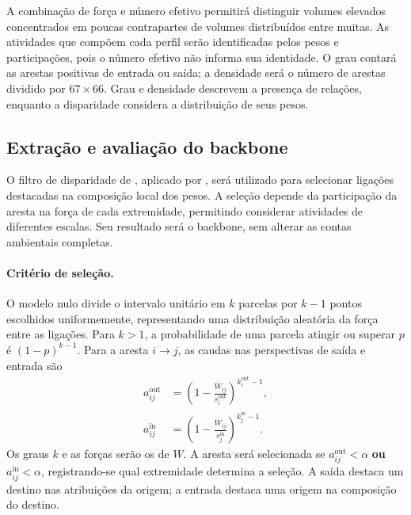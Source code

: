 \documentclass[12pt]{article}
\begin{document}
A combinação de força e número efetivo permitirá distinguir volumes elevados concentrados em poucas contrapartes de volumes distribuídos entre muitas. As atividades que compõem cada perfil serão identificadas pelos pesos e participações, pois o número efetivo não informa sua identidade. O grau contará as arestas positivas de entrada ou saída; a densidade será o número de arestas dividido por $67\times66$. Grau e densidade descrevem a presença de relações, enquanto a disparidade considera a distribuição de seus pesos.

\subsection{Extração e avaliação do backbone}
\label{sec:backbone}

O filtro de disparidade de \textcite{serrano2009}, aplicado por \textcite{huang2019}, será utilizado para selecionar ligações destacadas na composição local dos pesos. A seleção depende da participação da aresta na força de cada extremidade, permitindo considerar atividades de diferentes escalas. Seu resultado será o backbone, sem alterar as contas ambientais completas.

\paragraph{Critério de seleção.}
O modelo nulo divide o intervalo unitário em $k$ parcelas por $k-1$ pontos escolhidos uniformemente, representando uma distribuição aleatória da força entre as ligações. Para $k>1$, a probabilidade de uma parcela atingir ou superar $p$ é $(1-p)^{k-1}$. Para a aresta $i\rightarrow j$, as caudas nas perspectivas de saída e entrada são
\begin{equation}
\begin{aligned}
a_{ij}^{\mathrm{out}}&=\left(1-\frac{W_{ij}}{s_i^{\mathrm{out}}}\right)^{k_i^{\mathrm{out}}-1},\\
a_{ij}^{\mathrm{in}}&=\left(1-\frac{W_{ij}}{s_j^{\mathrm{in}}}\right)^{k_j^{\mathrm{in}}-1}.
\end{aligned}
\label{eq:caudas-filtro}
\end{equation}
Os graus $k$ e as forças serão os de $W$. A aresta será selecionada se $a_{ij}^{\mathrm{out}}<\alpha$ \textbf{ou} $a_{ij}^{\mathrm{in}}<\alpha$, registrando-se qual extremidade determina a seleção. A saída destaca um destino nas atribuições da origem; a entrada destaca uma origem na composição do destino.
\end{document}
